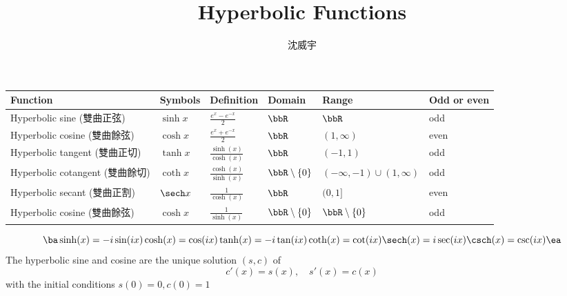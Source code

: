 \documentclass[a4paper,12pt]{report}
\begin{document}
\title{Hyperbolic Functions}
\author{沈威宇}
\date{\temtoday}
\titletocdoc
\renewcommand{\arraystretch}{1.5}
{\fontsize{8pt}{10pt}\selectfont
\begin{longtable}[c]{|p{}|p{}|p{}|p{}|p{}|p{}|}
\hline
    Function & Symbols & Definition & Domain & Range & Odd or even \\\hline\endhead
    Hyperbolic sine (雙曲正弦) & $\sinh x$ & $\frac{e^{x}-e^{-x}}{2}$ & $\bbR$ & $\bbR$ & odd \\\hline
    Hyperbolic cosine (雙曲餘弦) & $\cosh x$ & $\frac{e^{x}+e^{-x}}{2}$ & $\bbR$ & $(1,\infty)$ & even \\\hline
    Hyperbolic tangent (雙曲正切) & $\tanh x$ & $\frac{\sinh(x)}{\cosh(x)}$ & $\bbR$ & $(-1,1)$ & odd \\\hline
    Hyperbolic cotangent (雙曲餘切) & $\coth x$ & $\frac{\cosh(x)}{\sinh(x)}$ & $\bbR\setminus\{0\}$ & $(-\infty,-1)\cup(1,\infty)$ & odd \\\hline
    Hyperbolic secant (雙曲正割) & $\sech x$ & $\frac{1}{\cosh(x)}$ & $\bbR$ & $(0,1]$ & even \\\hline
    Hyperbolic cosine (雙曲餘弦) & $\cosh x$ & $\frac{1}{\sinh(x)}$ & $\bbR\setminus\{0\}$ & $\bbR\setminus\{0\}$ & odd \\\hline
\end{longtable}
\FB}
\[\ba
\sinh(x)=-i\sin(ix)\\
\cosh(x)=\cos(ix)\\
\tanh(x)=-i\tan(ix)\\
\coth(x)=\cot(ix)\\
\sech(x)=i\sec(ix)\\
\csch(x)=\csc(ix)
\ea\]
The hyperbolic sine and cosine are the unique solution $(s, c)$ of
\[c'(x)=s(x),\quad s'(x)=c(x)\]
with the initial conditions $s(0)=0,c(0)=1$
\end{document}

